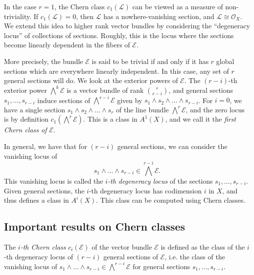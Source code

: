 In the case $r=1$, the Chern class $c_1(\mathcal{L})$ can be viewed as a measure of non-triviality. If $c_1(\mathcal{L}) = 0$, then $\mathcal{L}$ has a nowhere-vanishing section, and $\mathcal{L} \cong \mathcal{O}_X$. We extend this idea to higher rank vector bundles by considering the ``degeneracy locus'' of collections of sections. Roughly, this is the locus where the sections become linearly dependent in the fibers of $\mathcal{E}$.

More precisely, the bundle $\mathcal{E}$ is said to be trivial if and only if it has $r$ global sections  which are everywhere linearly independent. In this case, any set of $r$ general sections will do.  We look at the exterior powers of $\mathcal{E}$. The $(r-i)$-th exterior power $\bigwedge^k \mathcal{E}$ is a vector bundle of rank $\binom{r}{r-i}$, and general sections $s_1, \dots, s_{r-i}$ induce sections of $\bigwedge^{r-i} \mathcal{E}$ given by $s_{1} \wedge s_{2} \wedge \dots \wedge s_{r-i}$. For $i=0$, we have a single section $s_1 \wedge s_2 \wedge \dots \wedge s_r$ of the line bundle $\bigwedge^r \mathcal{E}$, and the zero locus is by definition $c_1(\bigwedge^r \mathcal{E})$. This is a class in $A^1(X)$, and we call it the \emph{first Chern class of $\mathcal{E}$}.

In general, we have that for $(r-i)$ general sections, we can consider the vanishing locus of 
\[s_1 \wedge \dots \wedge s_{r-i} \in \bigwedge^{r-i} \mathcal{E}.\]
This vanishing locus is called the \emph{$i$-th degeneracy locus} of the sections $s_1, \dots, s_{r-i}$. Given general sections, the $i$-th degeneracy locus has codimension $i$ in $X$, and thus defines a class in $A^i(X)$. This class can be computed using Chern classes.




\subsection{Important results on Chern classes}

The \emph{$i$-th Chern class} $c_i(\mathcal{E})$ of the vector bundle $\mathcal{E}$ is defined as the class of the $i$-th degeneracy locus of $(r-i)$ general sections of $\mathcal{E}$, i.e. the class of the vanishing locus of $s_1 \wedge \dots \wedge s_{r-i} \in \bigwedge^{r-i} \mathcal{E}$ for general sections $s_1, \dots, s_{r-i}$.

